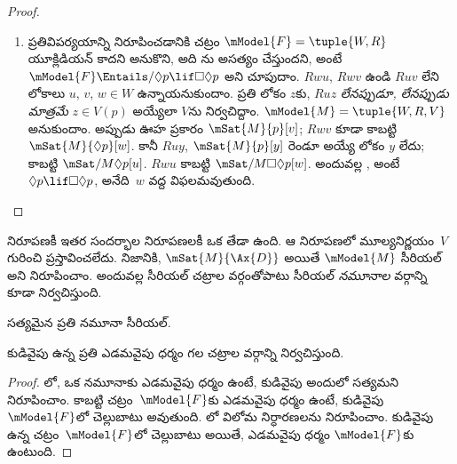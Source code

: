 \documentclass[../../../include/open-logic-section]{subfiles}
\begin{document}
\begin{proof}
\begin{enumerate}
    $z \in V(p)$ అయ్యేలా $V$ను నిర్వచిద్దాం
    (మిగిలిన చరాలపై $V$ ఏదైనా కావచ్చు).
    $\mModel{M} =\tuple{W, R, V}$ అనుకుందాం.
    $V$ నిర్వచనం వల్ల $Ruz$ అయ్యే అన్ని $z$లకు
    $\mSat{M}{p}[z]$; కనుక $\mSat{M}{\Box p}[u]$.
    అయితే ఊహ ప్రకారం , అంటే $\Box p
    \lif \Box \Box p$, అనేది $u$ వద్ద సత్యం;
    అందువల్ల $\mSat{M}{\Box \Box
      p}[u]$. $Ruv$, $Rvw$ కాబట్టి
    $\mSat{M}{p}[w]$; $V$ నిర్వచనం ప్రకారం
    ఇది $Ruw$ అయినప్పుడే సాధ్యం. అదే కావలసింది.
  \item ప్రతివిపర్యయాన్ని నిరూపించడానికి చట్రం
    $\mModel{F} = \tuple{W, R}$ యూక్లిడియన్ కాదని
    అనుకొని, అది ను అసత్యం చేస్తుందని,
    అంటే $\mModel{F} \Entails/ \Diamond p \lif
      \Box\Diamond p$ అని చూపుదాం. $Rwu$,
    $Rwv$ ఉండి $Ruv$ లేని లోకాలు $u$, $v$,
    $w \in W$ ఉన్నాయనుకుందాం. ప్రతి లోకం $z$కు,
    $Ruz$ \emph{లేనప్పుడూ, లేనప్పుడు మాత్రమే}
    $z \in V(p)$ అయ్యేలా $V$ను నిర్వచిద్దాం.
    $\mModel{M} =\tuple{W, R, V}$ అనుకుందాం.
    అప్పుడు ఊహ ప్రకారం $\mSat{M}{p}[v]$;
    $Rwv$ కూడా కాబట్టి $\mSat{M}{\Diamond p}[w]$.
    కానీ $Ruy$, $\mSat{M}{p}[y]$ రెండూ అయ్యే లోకం
    $y$ లేదు; కాబట్టి $\mSat/{M}{\Diamond
      p}[u]$. $Rwu$ కాబట్టి
    $\mSat/{M}{\Box\Diamond
      p}[w]$. అందువల్ల , అంటే
    $\Diamond p \lif \Box\Diamond p$, అనేది~$w$
    వద్ద విఫలమవుతుంది.
  \end{enumerate}
\end{proof}

 నిరూపణకీ ఇతర సందర్భాల నిరూపణలకీ
ఒక తేడా ఉంది. ఆ నిరూపణలో మూల్యనిర్ణయం~$V$
గురించి ప్రస్తావించలేదు. నిజానికి,
$\mSat{M}{\Ax{D}}$ అయితే $\mModel{M}$
సీరియల్ అని నిరూపించాం. అందువల్ల 
సీరియల్ చట్రాల వర్గంతోపాటు సీరియల్ \emph{నమూనాల}
వర్గాన్ని కూడా నిర్వచిస్తుంది.

\begin{cor}
   సత్యమైన ప్రతి నమూనా సీరియల్.
\end{cor}

\begin{cor}
 కుడివైపు ఉన్న ప్రతి
 ఎడమవైపు ధర్మం గల
చట్రాల వర్గాన్ని నిర్వచిస్తుంది.
\end{cor}

\begin{proof}
  లో, ఒక నమూనాకు
  ఎడమవైపు ధర్మం ఉంటే, కుడివైపు
   అందులో సత్యమని
  నిరూపించాం. కాబట్టి చట్రం~$\mModel{F}$కు
  ఎడమవైపు ధర్మం ఉంటే, కుడివైపు
   $\mModel{F}$లో
  చెల్లుబాటు అవుతుంది. లో
  విలోమ నిర్ధారణలను నిరూపించాం. కుడివైపు ఉన్న
   చట్రం~$\mModel{F}$లో
  చెల్లుబాటు అయితే, ఎడమవైపు ధర్మం
  $\mModel{F}$కు ఉంటుంది.
\end{proof}
\end{document}
